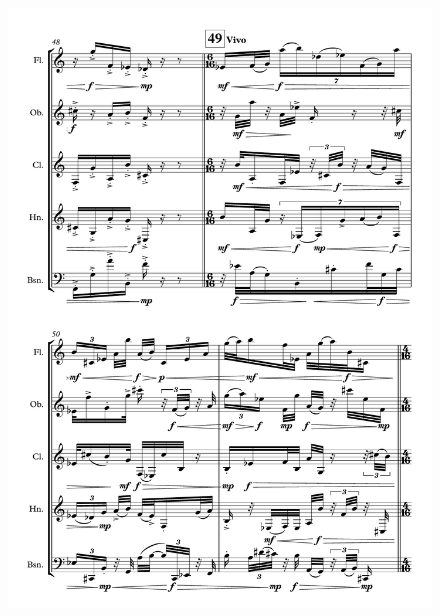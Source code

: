 \begin{figure}[H]
    \centering
	\includegraphics[width=6.5in]{figures/Out_of_Focus_10.pdf}
\end{figure}

